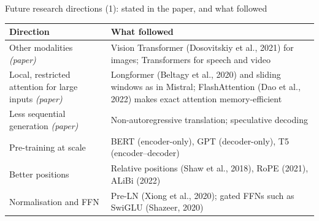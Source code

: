 \documentclass[aspectratio=169,11pt]{beamer}
\begin{document}
\begin{frame}{Future research directions (1): stated in the paper, and what followed}
  \small
  \begin{tabularx}{\textwidth}{@{}lX@{}}
    \toprule
    Direction & What followed\\
    \midrule
    Other modalities \emph{(paper)} & Vision Transformer (Dosovitskiy et al., 2021) for images; Transformers for speech and video\\
    Local, restricted attention for large inputs \emph{(paper)} & Longformer (Beltagy et al., 2020) and sliding windows as in Mistral; FlashAttention (Dao et al., 2022) makes exact attention memory-efficient\\
    Less sequential generation \emph{(paper)} & Non-autoregressive translation; speculative decoding\\
    Pre-training at scale & BERT (encoder-only), GPT (decoder-only), T5 (encoder--decoder)\\
    Better positions & Relative positions (Shaw et al., 2018), RoPE (2021), ALiBi (2022)\\
    Normalisation and FFN & Pre-LN (Xiong et al., 2020); gated FFNs such as SwiGLU (Shazeer, 2020)\\
    \bottomrule
  \end{tabularx}
\end{frame}
\end{document}
